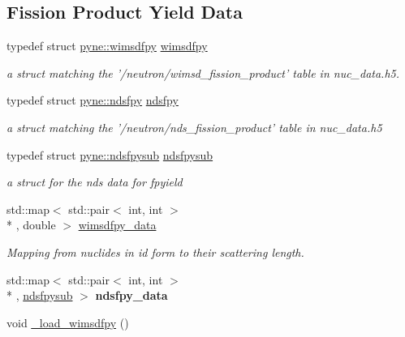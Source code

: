 \subsection*{Fission Product Yield Data}
\begin{DoxyCompactItemize}
\item 
\hypertarget{namespacepyne_a8346e297aba51dd65836af1b9b1e22c6}{typedef struct \hyperlink{structpyne_1_1wimsdfpy}{pyne\+::wimsdfpy} \hyperlink{namespacepyne_a8346e297aba51dd65836af1b9b1e22c6}{wimsdfpy}}\label{namespacepyne_a8346e297aba51dd65836af1b9b1e22c6}

\begin{DoxyCompactList}\small\item\em a struct matching the '/neutron/wimsd\+\_\+fission\+\_\+product' table in nuc\+\_\+data.\+h5. \end{DoxyCompactList}\item 
\hypertarget{namespacepyne_a96952abe65e3f7b41e1b8a93c123f5b1}{typedef struct \hyperlink{structpyne_1_1ndsfpy}{pyne\+::ndsfpy} \hyperlink{namespacepyne_a96952abe65e3f7b41e1b8a93c123f5b1}{ndsfpy}}\label{namespacepyne_a96952abe65e3f7b41e1b8a93c123f5b1}

\begin{DoxyCompactList}\small\item\em a struct matching the '/neutron/nds\+\_\+fission\+\_\+product' table in nuc\+\_\+data.\+h5 \end{DoxyCompactList}\item 
\hypertarget{namespacepyne_a38819ae9154f678484f27f785b29c275}{typedef struct \hyperlink{structpyne_1_1ndsfpysub}{pyne\+::ndsfpysub} \hyperlink{namespacepyne_a38819ae9154f678484f27f785b29c275}{ndsfpysub}}\label{namespacepyne_a38819ae9154f678484f27f785b29c275}

\begin{DoxyCompactList}\small\item\em a struct for the nds data for fpyield \end{DoxyCompactList}\item 
std\+::map$<$ std\+::pair$<$ int, int $>$\\*
, double $>$ \hyperlink{namespacepyne_a2512ebcde5e39e49cd6ed25bb09ff374}{wimsdfpy\+\_\+data}
\begin{DoxyCompactList}\small\item\em Mapping from nuclides in id form to their scattering length. \end{DoxyCompactList}\item 
std\+::map$<$ std\+::pair$<$ int, int $>$\\*
, \hyperlink{structpyne_1_1ndsfpysub}{ndsfpysub} $>$ {\bfseries ndsfpy\+\_\+data}
\item 
\hypertarget{namespacepyne_a32682c82d07a8370677923550dbc9904}{void \hyperlink{namespacepyne_a32682c82d07a8370677923550dbc9904}{\+\_\+load\+\_\+wimsdfpy} ()}\label{namespacepyne_a32682c82d07a8370677923550dbc9904}


\end{DoxyCompactItemize}
